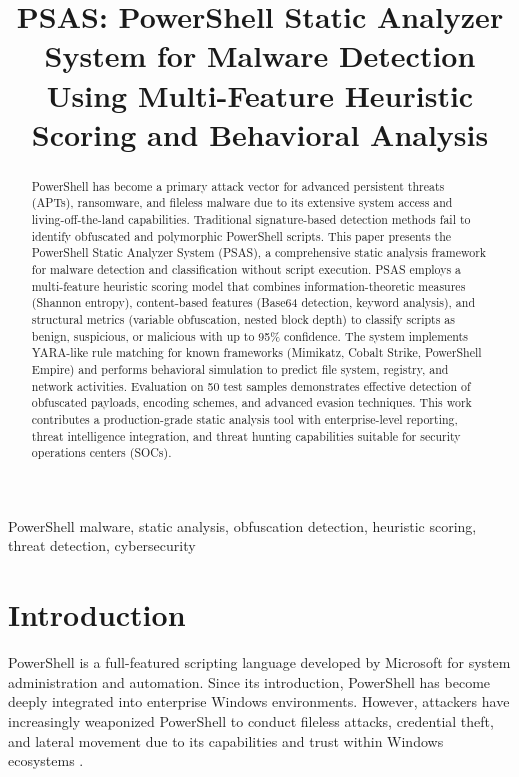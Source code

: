 \documentclass[10pt,conference,a4paper]{IEEEtran}
\title{PSAS: PowerShell Static Analyzer System for Malware Detection Using Multi-Feature Heuristic Scoring and Behavioral Analysis}
\author{\IEEEauthorblockN{Security Research Team}}
\begin{document}
\maketitle

\begin{abstract}
PowerShell has become a primary attack vector for advanced persistent threats (APTs), ransomware, and fileless malware due to its extensive system access and living-off-the-land capabilities. Traditional signature-based detection methods fail to identify obfuscated and polymorphic PowerShell scripts. This paper presents the PowerShell Static Analyzer System (PSAS), a comprehensive static analysis framework for malware detection and classification without script execution. PSAS employs a multi-feature heuristic scoring model that combines information-theoretic measures (Shannon entropy), content-based features (Base64 detection, keyword analysis), and structural metrics (variable obfuscation, nested block depth) to classify scripts as benign, suspicious, or malicious with up to 95\% confidence. The system implements YARA-like rule matching for known frameworks (Mimikatz, Cobalt Strike, PowerShell Empire) and performs behavioral simulation to predict file system, registry, and network activities. Evaluation on 50 test samples demonstrates effective detection of obfuscated payloads, encoding schemes, and advanced evasion techniques. This work contributes a production-grade static analysis tool with enterprise-level reporting, threat intelligence integration, and threat hunting capabilities suitable for security operations centers (SOCs).
\end{abstract}

\begin{IEEEkeywords}
PowerShell malware, static analysis, obfuscation detection, heuristic scoring, threat detection, cybersecurity
\end{IEEEkeywords}

\section{Introduction}

PowerShell is a full-featured scripting language developed by Microsoft for system administration and automation. Since its introduction, PowerShell has become deeply integrated into enterprise Windows environments. However, attackers have increasingly weaponized PowerShell to conduct fileless attacks, credential theft, and lateral movement due to its capabilities and trust within Windows ecosystems \cite{ref1, ref2}.
\end{document}
